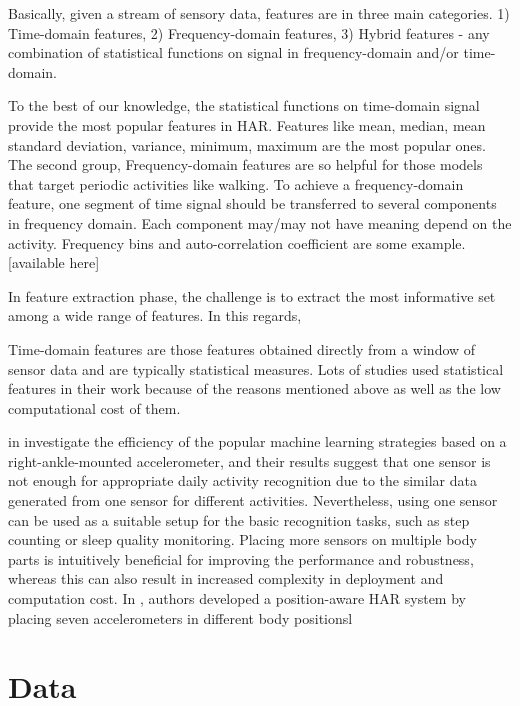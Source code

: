 \documentclass[journal,article,submit,moreauthors,pdftex]{Definitions/mdpi}
\begin{document}
Basically, given a stream of sensory data, features are in three main categories.\cite{wang2019survey} 1) Time-domain features, 2) Frequency-domain features, 3) Hybrid features - any combination of statistical functions on signal in frequency-domain and/or time-domain. 

To the best of our knowledge, the statistical functions on time-domain signal provide the most popular features in HAR. Features like mean, median, mean standard deviation, variance, minimum, maximum are the most popular ones. The second group, Frequency-domain features are so helpful for those models that target periodic activities like walking. To achieve a frequency-domain feature, one segment of time signal should be transferred to several components in frequency domain. Each component may/may not have meaning depend on the activity. Frequency bins and auto-correlation coefficient are some example.[available here]

In feature extraction phase, the challenge is to extract the most informative set among a wide range of features\cite{krishnan2009recognition}.  In this regards,


Time-domain features are those features obtained directly from a window of sensor data and are typically statistical measures.  Lots of studies used statistical features in their work because of the reasons mentioned above as well as the low computational cost of them.




in \cite{Suto et al., 2017} investigate the efficiency of the popular machine learning strategies based on a right-ankle-mounted accelerometer, and their results suggest that one sensor is not enough for appropriate daily activity recognition due to the similar data generated from one sensor for different activities. Nevertheless, using one sensor can be used as a suitable setup for the basic recognition tasks, such as step counting or sleep quality monitoring. Placing more sensors on multiple body parts is intuitively beneficial for improving the performance and robustness, whereas this can also result in increased complexity in deployment and computation cost. In \cite{Sztyler et al.}, authors developed a position-aware HAR system by placing seven accelerometers in different body positionsl
\section{Data}
\end{document}
